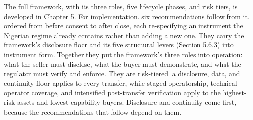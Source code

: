 The full framework, with its three roles, five lifecycle phases, and
risk tiers, is developed in Chapter 5. For implementation, six
recommendations follow from it, ordered from before consent to after
close, each re-specifying an instrument the Nigerian regime already
contains rather than adding a new one. They carry the framework's
disclosure floor and its five structural levers (Section 5.6.3) into
instrument form. Together they put the framework's three roles into
operation: what the seller must disclose, what the buyer must
demonstrate, and what the regulator must verify and enforce. They are
risk-tiered: a disclosure, data, and continuity floor applies to every
transfer, while staged operatorship, technical-operator coverage, and
intensified post-transfer verification apply to the highest-risk assets
and lowest-capability buyers. Disclosure and continuity come first,
because the recommendations that follow depend on them.

